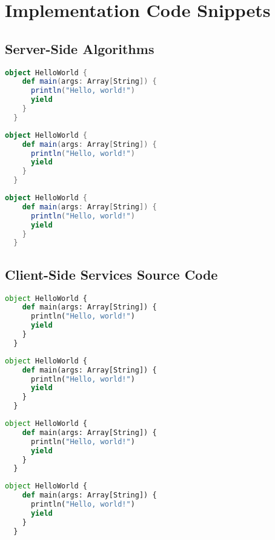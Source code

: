\chapter{Implementation Code Snippets} \label{chap:app-code}

\section{Server-Side Algorithms}

\begin{lstlisting}[language=Scala,caption={Implementation of the \texttt{SDNN} algorithm.},label=code:sdnn]
 object HelloWorld {
    def main(args: Array[String]) {
      println("Hello, world!")
      yield
    }
  }
\end{lstlisting}

\begin{lstlisting}[language=Scala,caption={Implementation of the \texttt{HRVBands} algorithm.},label=code:hrvbands]
 object HelloWorld {
    def main(args: Array[String]) {
      println("Hello, world!")
      yield
    }
  }
\end{lstlisting}

\begin{lstlisting}[language=Scala,caption={Implementation of the \texttt{Identity} algorithm.},label=code:identity]
 object HelloWorld {
    def main(args: Array[String]) {
      println("Hello, world!")
      yield
    }
  }
\end{lstlisting}

\section{Client-Side Services Source Code}

\begin{lstlisting}[language=Python,caption={Implementation of the \texttt{sensor} service.},label=code:sensor]
 object HelloWorld {
    def main(args: Array[String]) {
      println("Hello, world!")
      yield
    }
  }
\end{lstlisting}

\begin{lstlisting}[language=Python,caption={Implementation of the \texttt{mqtt-subscriber} service.},label=code:mqtt-sub]
 object HelloWorld {
    def main(args: Array[String]) {
      println("Hello, world!")
      yield
    }
  }
\end{lstlisting}

\begin{lstlisting}[language=Python,caption={Implementation of the \texttt{producer} service.},label=code:producer]
 object HelloWorld {
    def main(args: Array[String]) {
      println("Hello, world!")
      yield
    }
  }
\end{lstlisting}

\begin{lstlisting}[language=Python,caption={Implementation of the \texttt{consumer} service.},label=code:consumer]
 object HelloWorld {
    def main(args: Array[String]) {
      println("Hello, world!")
      yield
    }
  }
\end{lstlisting}
